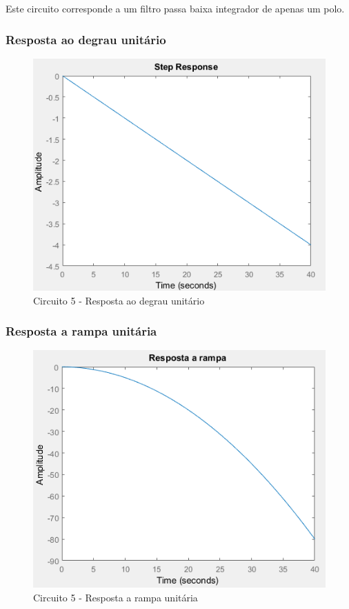 \documentclass[a4paper, 12pt]{article}
\begin{document}
			Este circuito corresponde a um filtro passa baixa integrador de apenas um polo.

			\subsubsection{Resposta ao degrau unitário}
			\begin{figure}[!ht]
				\centering
				\includegraphics[scale=0.71]{img/1g_circ5.png}
				\caption{Circuito 5 - Resposta ao degrau unitário}
			\end{figure}
			\subsubsection{Resposta a rampa unitária}
			\begin{figure}[!ht]
				\centering
				\includegraphics[scale=0.72]{img/1h_circ5.png}
				\caption{Circuito 5 - Resposta a rampa unitária}
			\end{figure}
\end{document}
